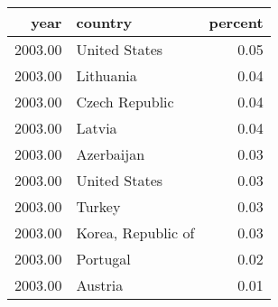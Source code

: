 \begin{table}[ht]
\centering
\begin{tabular}{rlr}
  \hline
year & country & percent \\ 
  \hline
2003.00 & United States & 0.05 \\ 
  2003.00 & Lithuania & 0.04 \\ 
  2003.00 & Czech Republic & 0.04 \\ 
  2003.00 & Latvia & 0.04 \\ 
  2003.00 & Azerbaijan & 0.03 \\ 
  2003.00 & United States & 0.03 \\ 
  2003.00 & Turkey & 0.03 \\ 
  2003.00 & Korea, Republic of & 0.03 \\ 
  2003.00 & Portugal & 0.02 \\ 
  2003.00 & Austria & 0.01 \\ 
   \hline
\end{tabular}
\end{table}
